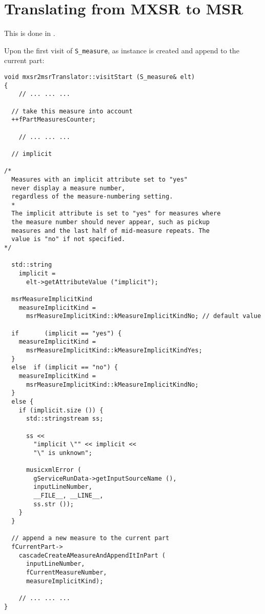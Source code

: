 

\section{Translating from MXSR to MSR}

This is done in \mxsrToMsr{}.

Upon the first visit of {\tt S_measure}, as  instance is created and append to the current part:
\begin{lstlisting}[language=CPlusPlus]
void mxsr2msrTranslator::visitStart (S_measure& elt)
{
	// ... ... ...

  // take this measure into account
  ++fPartMeasuresCounter;

	// ... ... ...

  // implicit

/*
  Measures with an implicit attribute set to "yes"
  never display a measure number,
  regardless of the measure-numbering setting.
  *
  The implicit attribute is set to "yes" for measures where
  the measure number should never appear, such as pickup
  measures and the last half of mid-measure repeats. The
  value is "no" if not specified.
*/

  std::string
    implicit =
      elt->getAttributeValue ("implicit");

  msrMeasureImplicitKind
    measureImplicitKind =
      msrMeasureImplicitKind::kMeasureImplicitKindNo; // default value

  if       (implicit == "yes") {
    measureImplicitKind =
      msrMeasureImplicitKind::kMeasureImplicitKindYes;
  }
  else  if (implicit == "no") {
    measureImplicitKind =
      msrMeasureImplicitKind::kMeasureImplicitKindNo;
  }
  else {
    if (implicit.size ()) {
      std::stringstream ss;

      ss <<
        "implicit \"" << implicit <<
        "\" is unknown";

      musicxmlError (
        gServiceRunData->getInputSourceName (),
        inputLineNumber,
        __FILE__, __LINE__,
        ss.str ());
    }
  }

  // append a new measure to the current part
  fCurrentPart->
    cascadeCreateAMeasureAndAppendItInPart (
      inputLineNumber,
      fCurrentMeasureNumber,
      measureImplicitKind);

	// ... ... ...
}
\end{lstlisting}

